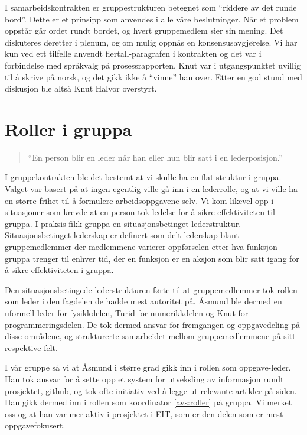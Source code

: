 I samarbeidskontrakten er gruppestrukturen betegnet som ``riddere av det runde
bord''. Dette er et prinsipp som anvendes i alle våre beslutninger. Når et
problem oppstår går ordet rundt bordet, og hvert gruppemedlem sier sin mening.
Det diskuteres deretter i plenum, og om mulig oppnås en konsensusavgjørelse. Vi
har kun ved ett tilfelle anvendt flertall-paragrafen i kontrakten og det var i
forbindelse med språkvalg på prosessrapporten. Knut var i utgangspunktet uvillig
til å skrive på norsk, og det gikk ikke å ``vinne'' han over. Etter en god stund
med diskusjon ble altså Knut Halvor overstyrt.

\section{Roller i gruppa}
\begin{quote}
``En person blir en leder når han eller hun blir satt i en lederposisjon.''
\end{quote}

I gruppekontrakten ble det bestemt at vi skulle ha en flat struktur i gruppa. Valget 
var basert på at ingen egentlig ville gå inn i en lederrolle, og at vi ville ha en 
større frihet til å formulere arbeidsoppgavene selv. Vi kom likevel opp i situasjoner
som krevde at en person tok ledelse for å sikre effektiviteten til gruppa. I praksis 
fikk gruppa en situasjonsbetinget lederstruktur. Situasjonsbetinget lederskap er definert
som delt lederskap blant gruppemedlemmer der medlemmene varierer oppførselen etter hva
funksjon gruppa trenger til enhver tid, der en funksjon er en aksjon som blir satt 
igang for å sikre effektiviteten i gruppa.

Den situasjonsbetingede lederstrukturen førte til at gruppemedlemmer tok rollen som 
leder i den fagdelen de hadde mest autoritet på. Åsmund ble dermed en uformell leder 
for fysikkdelen, Turid for numerikkdelen og Knut for programmeringsdelen. De 
tok dermed ansvar for fremgangen og oppgavedeling på disse områdene, og strukturerte
samarbeidet mellom gruppemedlemmene på sitt respektive felt. 

I vår gruppe så vi at Åsmund i større grad gikk inn i rollen som oppgave-leder. Han 
tok ansvar for å sette opp et system for utveksling av informasjon rundt prosjektet, 
github, og tok ofte initiativ ved å legge ut relevante artikler på siden. Han gikk 
dermed inn i rollen som koordinator \cref{avs:roller} på gruppa. Vi merket oss og at han var 
mer aktiv i prosjektet i EIT, som er den delen som er mest oppgavefokusert. 

